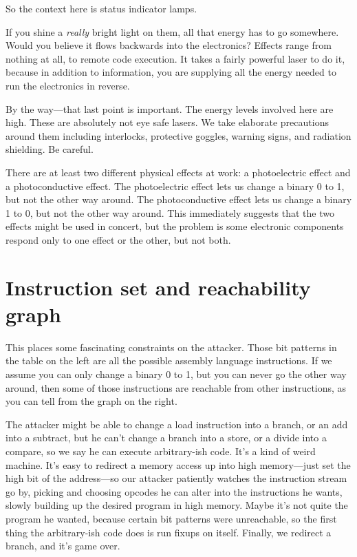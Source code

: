 \documentclass[letterpaper]{article}
\begin{document}
So the context here is status indicator lamps.

If you shine a \emph{really} bright light on them, all that energy has to go
somewhere. Would you believe it flows backwards into the electronics? Effects
range from nothing at all, to remote code execution. It takes a fairly powerful
laser to do it, because in addition to information, you are supplying all the
energy needed to run the electronics in reverse.

By the way---that last point is important. The energy levels involved here are
high. These are absolutely not eye safe lasers. We take elaborate precautions
around them including interlocks, protective goggles, warning signs, and
radiation shielding. Be careful.

There are at least two different physical effects at work: a photoelectric
effect and a photoconductive effect. The photoelectric effect lets us change a
binary 0 to 1, but not the other way around. The photoconductive effect lets us
change a binary 1 to 0, but not the other way around. This immediately suggests
that the two effects might be used in concert, but the problem is some
electronic components respond only to one effect or the other, but not both.

\section{Instruction set and reachability graph}

This places some fascinating constraints on the attacker. Those bit
patterns in the table on the left are all the possible assembly language
instructions. If we assume you can only change a binary 0 to 1, but you can
never go the other way around, then some of those instructions are reachable
from other instructions, as you can tell from the graph on the right.

The attacker might be able to change a load instruction into a branch, or an
add into a subtract, but he can't change a branch into a store, or a divide
into a compare, so we say he can execute arbitrary-ish code. It's a kind of
weird machine. It's easy to redirect a memory access up into high memory---just
set the high bit of the address---so our attacker patiently watches the
instruction stream go by, picking and choosing opcodes he can alter into the
instructions he wants, slowly building up the desired program in high memory.
Maybe it's not quite the program he wanted, because certain bit patterns were
unreachable, so the first thing the arbitrary-ish code does is run fixups on
itself. Finally, we redirect a branch, and it's game over.
\end{document}
